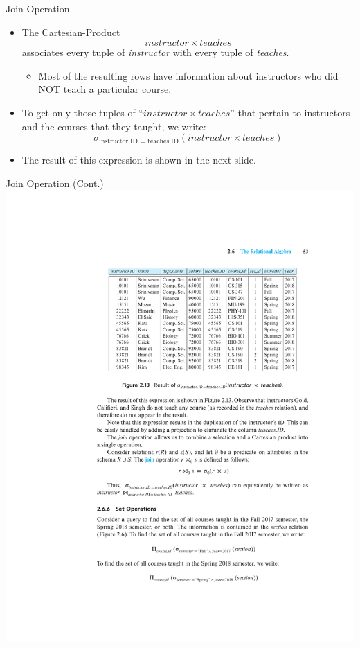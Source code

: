 \documentclass{beamer}
\begin{document}
\begin{frame}{Join Operation}
    \begin{itemize}
        \item The Cartesian-Product
        $$
            instructor \times teaches
        $$
        associates every tuple of \textit{instructor} with every tuple of \textit{teaches}.
        \begin{itemize}
            \item Most of the resulting rows have information about instructors who did NOT teach a particular course.
        \end{itemize}
        \item To get only those tuples of ``$instructor \times teaches$'' that pertain to instructors and the courses that they taught, we write:
        {\Large
            $$
                \sigma_{\text{instructor.ID } = \text{ teaches.ID}}( instructor \times teaches )
            $$
        }
        \item The result of this expression is shown in the next slide.
    \end{itemize}
\end{frame}

\begin{frame}{Join Operation (Cont.)}
    \centering
    \includegraphics[width=\textwidth, trim={6.35cm 16.75cm 3.55cm 4.80cm}, clip]{figures/db_join}
\end{frame}
\end{document}
